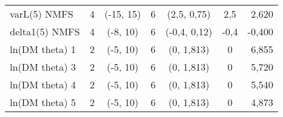 \begin{table}[!h]
\begin{tabular}{lcccccr}
varL(5) NMFS & 4 & (-15, 15) & 6 & (2,5, 0,75) & 2,5 & 2,620 \\
delta1(5) NMFS & 4 & (-8, 10) & 6 & (-0,4, 0,12) & -0,4 & -0,400 \\
ln(DM theta) 1 & 2 & (-5, 10) & 6 & (0, 1,813) & 0 & 6,855 \\
ln(DM theta) 3 & 2 & (-5, 10) & 6 & (0, 1,813) & 0 & 5,720 \\
ln(DM theta) 4 & 2 & (-5, 10) & 6 & (0, 1,813) & 0 & 5,540 \\
ln(DM theta) 5 & 2 & (-5, 10) & 6 & (0, 1,813) & 0 & 4,873 \\
\hline
\end{tabular}
\usefont{\encodingdefault}{\familydefault}{\seriesdefault}{\shapedefault}\normalsize
\end{table}


